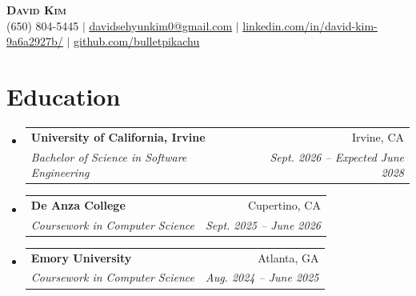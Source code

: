 \documentclass[letterpaper,11pt]{article}
\makeatletter
\newcommand{\resumeSubheading}[4]{
  \vspace{-2pt}\item
    \begin{tabular*}{0.97\textwidth}[t]{l@{\extracolsep{\fill}}r}
      \textbf{#1} & #2 \\
      \textit{\small#3} & \textit{\small #4} \\
    \end{tabular*}\vspace{-7pt}
}
\newcommand{\resumeSubHeadingListStart}{\begin{itemize}[leftmargin=0.15in, label={}]}
\newcommand{\resumeSubHeadingListEnd}{\end{itemize}}
\makeatother
\begin{document}

\begin{center}
    \textbf{\Huge \scshape David Kim}  \\ \vspace{1pt}
    \small (650) 804-5445 $|$ \href{mailto:davidsehyunkim0@gmail.com}{\underline{davidsehyunkim0@gmail.com}} $|$ 
    \href{https://www.linkedin.com/in/david-kim-9a6a2927b/}{\underline{linkedin.com/in/david-kim-9a6a2927b/}} $|$
    \href{https://github.com/bulletpikachu}{\underline{github.com/bulletpikachu}}
\end{center}


\section{Education}
  \resumeSubHeadingListStart
    \resumeSubheading
      {University of California, Irvine}{Irvine, CA}
      {Bachelor of Science in Software Engineering}{Sept. 2026 -- Expected June 2028}
    \resumeSubheading
      {De Anza College}{Cupertino, CA}
      {Coursework in Computer Science}{Sept. 2025 -- June 2026}
    \resumeSubheading
      {Emory University}{Atlanta, GA}
      {Coursework in Computer Science}{Aug. 2024 -- June 2025}
  \resumeSubHeadingListEnd

\end{document}
